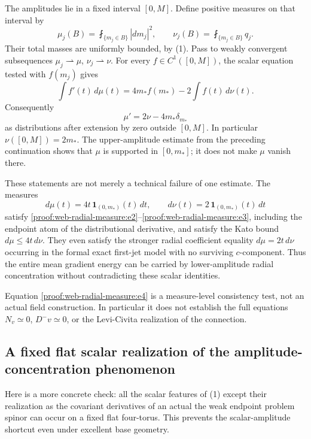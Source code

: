 The amplitudes lie in a fixed interval \([0,M]\). Define positive measures on that interval by \[
 \mu_j(B)=\fint_{\{m_j\in B\}}|dm_j|^2,
 \qquad \nu_j(B)=\fint_{\{m_j\in B\}}q_j.
\] Their total masses are uniformly bounded, by (1). Pass to weakly convergent subsequences \(\mu_j\rightharpoonup\mu\), \(\nu_j\rightharpoonup\nu\). For every \(f\in C^1([0,M])\), the scalar equation tested with \(f(m_j)\) gives \[
 \int f'(t)\,d\mu(t)
 =4m_*f(m_*)-2\int f(t)\,d\nu(t).
 \tag{\thesection.2}\label{proof:web-radial-measure:e2}
\] Consequently \[
 \mu'=2\nu-4m_*\delta_{m_*}
 \tag{\thesection.3}\label{proof:web-radial-measure:e3}
\] as distributions after extension by zero outside \([0,M]\). In particular \(\nu([0,M])=2m_*\). The upper-amplitude estimate from the preceding continuation shows that \(\mu\) is supported in \([0,m_*]\); it does not make \(\mu\) vanish there.

These statements are not merely a technical failure of one estimate. The measures \[
 d\mu(t)=4t\,\mathbf1_{(0,m_*)}(t)\,dt,
 \qquad d\nu(t)=2\,\mathbf1_{(0,m_*)}(t)\,dt
 \tag{\thesection.4}\label{proof:web-radial-measure:e4}
\] satisfy \eqref{proof:web-radial-measure:e2}–\eqref{proof:web-radial-measure:e3}, including the endpoint atom of the distributional derivative, and satisfy the Kato bound \(d\mu\le4t\,d\nu\). They even satisfy the stronger radial coefficient equality \(d\mu=2t\,d\nu\) occurring in the formal exact first-jet model with no surviving \(c\)-component. Thus the entire mean gradient energy can be carried by lower-amplitude radial concentration without contradicting these scalar identities.

Equation \eqref{proof:web-radial-measure:e4} is a measure-level consistency test, not an actual field construction. In particular it does not establish the full equations \(N_v\simeq0\), \(D^-v\simeq0\), or the Levi-Civita realization of the connection.

\hypertarget{proof:web-radial-measure:s3}{%
\subsection{A fixed flat scalar realization of the amplitude-concentration phenomenon}\label{proof:web-radial-measure:s3}}

Here is a more concrete check: all the scalar features of (1) except their realization as the covariant derivatives of an actual the weak endpoint problem spinor can occur on a fixed flat four-torus. This prevents the scalar-amplitude shortcut even under excellent base geometry.

